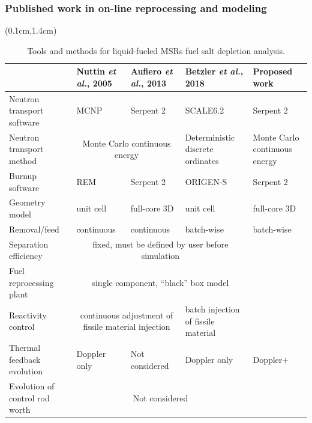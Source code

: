 \begin{frame}
\frametitle{Published work in on-line reprocessing and modeling}

  \begin{textblock*}{12.5cm}(0.1cm,1.4cm) %
	\begin{table}[t]
	\fontsize{6}{9}\selectfont
	\caption{Tools and methods for liquid-fueled \glspl{MSR} fuel salt depletion 
		analysis.}
		\vspace{-2mm}
	\begin{tabularx}{\textwidth}{X X X X p{3cm}} 
		\hline 
		&Nuttin \emph{et al.}, 2005 \cite{nuttin_potential_2005}& Aufiero \emph{et al.}, 
		2013 \cite{aufiero_extended_2013} & Betzler \emph{et al.}, 2018 
		\cite{betzler_fuel_2018}&Proposed work \\ 
		\hline
		Neutron transport software & \gls{MCNP} & Serpent 2 & SCALE6.2 & 
		Serpent 2 \\
		Neutron transport method & \multicolumn{2}{c}{Monte Carlo continuous 
		energy} & 
		Deterministic discrete ordinates & Monte Carlo continuous energy 
		\\
		Burnup software & REM & Serpent 2 & ORIGEN-S & Serpent 2 
		\\[3pt]
		Geometry model & unit cell & full-core 3D & unit cell & 
		full-core 3D\\ [3pt]
		Removal/feed  & continuous &continuous & batch-wise & 
		batch-wise\\[3pt]
		Separation efficiency &\multicolumn{3}{c}{fixed, must be defined by user 
			before simulation} & \color{red}{variable of many 
			parameters} \\[3pt]
		Fuel reprocessing plant & \multicolumn{3}{c}{single component, ``black'' box 
			model} & \color{red}{realistic multi-component model} 
			\\[3pt]
		Reactivity control & \multicolumn{2}{c}{continuous adjustment of 
		fissile material injection} & batch injection of fissile material & 
		\color{red}{periodical adjustment of geometry and fissile 
		material injection}\\[3pt]
		Thermal feedback evolution & Doppler only & Not considered & 
		Doppler only & Doppler$+$\color{red}{density+thermal 
		expansion}\\[3pt]
		Evolution of control rod worth & \multicolumn{3}{c}{Not considered} & 
		\color{red}{For single rod and all rods} \\
		\hline
	\end{tabularx}
	\label{tab:msr_codes}
\end{table}
\end{textblock*}

\end{frame}


